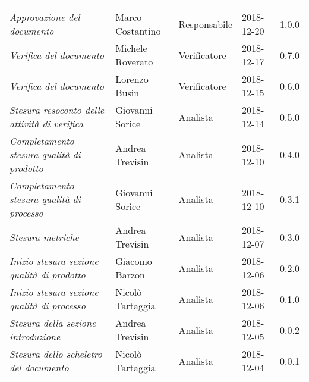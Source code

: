 \newpage 
\section*{}
\begin{table}[H]
	\centering
	\begin{tabular}{p{4cm}|C{3cm}|C{3cm}|R{2.5cm}|R{2cm}}
		
		 & & & & \\
		
		
		\emph{Approvazione del documento} & Marco Costantino & Responsabile & 2018-12-20 & 1.0.0 \\
		\hline
		
		\emph{Verifica del documento} & Michele Roverato & Verificatore & 2018-12-17 & 0.7.0 \\
		\hline
		
		\emph{Verifica del documento} & Lorenzo Busin & Verificatore & 2018-12-15 & 0.6.0 \\
		\hline
		
		\emph{Stesura resoconto delle attività di verifica} & Giovanni Sorice & Analista & 2018-12-14 & 0.5.0 \\
		\hline
		
		\emph{Completamento stesura qualità di prodotto} & Andrea Trevisin & Analista & 2018-12-10 & 0.4.0 \\
		\hline
		
		\emph{Completamento stesura qualità di processo} & Giovanni Sorice & Analista & 2018-12-10 & 0.3.1 \\
		\hline
		
		\emph{Stesura metriche} & Andrea Trevisin & Analista & 2018-12-07 & 0.3.0 \\
		\hline
		
		\emph{Inizio stesura sezione qualità di prodotto} & Giacomo Barzon & Analista & 2018-12-06 & 0.2.0 \\
		\hline
		
		\emph{Inizio stesura sezione qualità di processo} & Nicolò Tartaggia & Analista & 2018-12-06 & 0.1.0 \\
		\hline
		
		\emph{Stesura della sezione introduzione } & Andrea Trevisin & Analista & 2018-12-05 & 0.0.2 \\
		\hline
		
		\emph{Stesura dello scheletro del documento} & Nicolò Tartaggia & Analista & 2018-12-04 & 0.0.1 \\
		
	\end{tabular}
	
\end{table}


\clearpage